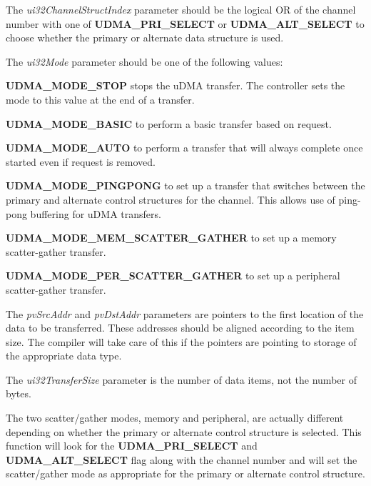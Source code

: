 The {\itshape ui32\+Channel\+Struct\+Index} parameter should be the logical OR of the channel number with one of {\bfseries U\+D\+M\+A\+\_\+\+P\+R\+I\+\_\+\+S\+E\+L\+E\+CT} or {\bfseries U\+D\+M\+A\+\_\+\+A\+L\+T\+\_\+\+S\+E\+L\+E\+CT} to choose whether the primary or alternate data structure is used.

The {\itshape ui32\+Mode} parameter should be one of the following values\+:


\begin{DoxyItemize}
\item {\bfseries U\+D\+M\+A\+\_\+\+M\+O\+D\+E\+\_\+\+S\+T\+OP} stops the u\+D\+MA transfer. The controller sets the mode to this value at the end of a transfer.
\item {\bfseries U\+D\+M\+A\+\_\+\+M\+O\+D\+E\+\_\+\+B\+A\+S\+IC} to perform a basic transfer based on request.
\item {\bfseries U\+D\+M\+A\+\_\+\+M\+O\+D\+E\+\_\+\+A\+U\+TO} to perform a transfer that will always complete once started even if request is removed.
\item {\bfseries U\+D\+M\+A\+\_\+\+M\+O\+D\+E\+\_\+\+P\+I\+N\+G\+P\+O\+NG} to set up a transfer that switches between the primary and alternate control structures for the channel. This allows use of ping-\/pong buffering for u\+D\+MA transfers.
\item {\bfseries U\+D\+M\+A\+\_\+\+M\+O\+D\+E\+\_\+\+M\+E\+M\+\_\+\+S\+C\+A\+T\+T\+E\+R\+\_\+\+G\+A\+T\+H\+ER} to set up a memory scatter-\/gather transfer.
\item {\bfseries U\+D\+M\+A\+\_\+\+M\+O\+D\+E\+\_\+\+P\+E\+R\+\_\+\+S\+C\+A\+T\+T\+E\+R\+\_\+\+G\+A\+T\+H\+ER} to set up a peripheral scatter-\/gather transfer.
\end{DoxyItemize}

The {\itshape pv\+Src\+Addr} and {\itshape pv\+Dst\+Addr} parameters are pointers to the first location of the data to be transferred. These addresses should be aligned according to the item size. The compiler will take care of this if the pointers are pointing to storage of the appropriate data type.

The {\itshape ui32\+Transfer\+Size} parameter is the number of data items, not the number of bytes.

The two scatter/gather modes, memory and peripheral, are actually different depending on whether the primary or alternate control structure is selected. This function will look for the {\bfseries U\+D\+M\+A\+\_\+\+P\+R\+I\+\_\+\+S\+E\+L\+E\+CT} and {\bfseries U\+D\+M\+A\+\_\+\+A\+L\+T\+\_\+\+S\+E\+L\+E\+CT} flag along with the channel number and will set the scatter/gather mode as appropriate for the primary or alternate control structure.

